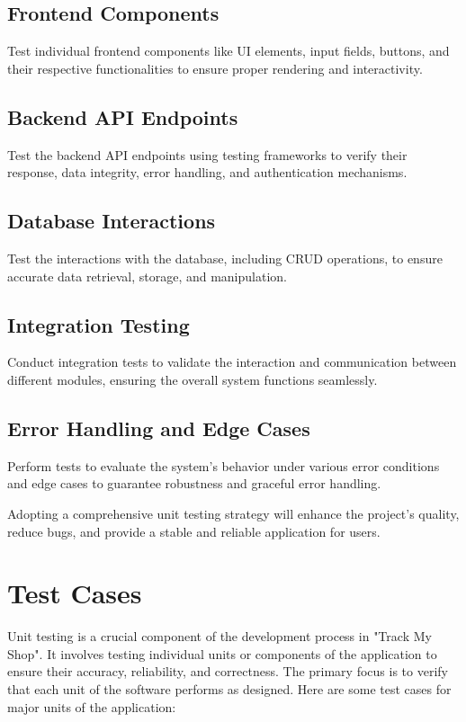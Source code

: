 \subsection{Frontend Components} Test individual frontend components like UI elements, input fields, buttons, and their respective functionalities to ensure proper rendering and interactivity.
	
\subsection{Backend API Endpoints} Test the backend API endpoints using testing frameworks to verify their response, data integrity, error handling, and authentication mechanisms.
	
\subsection{Database Interactions} Test the interactions with the database, including CRUD operations, to ensure accurate data retrieval, storage, and manipulation.
	
\subsection{Integration Testing} Conduct integration tests to validate the interaction and communication between different modules, ensuring the overall system functions seamlessly.
	
\subsection{Error Handling and Edge Cases} Perform tests to evaluate the system's behavior under various error conditions and edge cases to guarantee robustness and graceful error handling.


Adopting a comprehensive unit testing strategy will enhance the project's quality, reduce bugs, and provide a stable and reliable application for users.

\section{Test Cases}
Unit testing is a crucial component of the development process in "Track My Shop". It involves testing individual units or components of the application to ensure their accuracy, reliability, and correctness. The primary focus is to verify that each unit of the software performs as designed. Here are some test cases for major units of the application:


